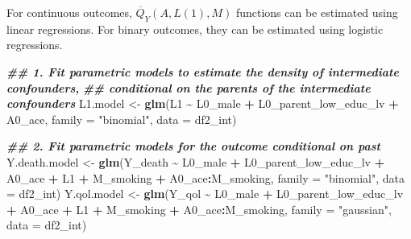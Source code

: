 \documentclass[
]{book}
\newenvironment{Shaded}{\begin{snugshade}}{\end{snugshade}}
\newcommand{\AttributeTok}[1]{\textcolor[rgb]{0.13,0.29,0.53}{#1}}
\newcommand{\DocumentationTok}[1]{\textcolor[rgb]{0.56,0.35,0.01}{\textbf{\textit{#1}}}}
\newcommand{\FunctionTok}[1]{\textcolor[rgb]{0.13,0.29,0.53}{\textbf{#1}}}
\newcommand{\NormalTok}[1]{#1}
\newcommand{\OtherTok}[1]{\textcolor[rgb]{0.56,0.35,0.01}{#1}}
\newcommand{\SpecialCharTok}[1]{\textcolor[rgb]{0.81,0.36,0.00}{\textbf{#1}}}
\newcommand{\StringTok}[1]{\textcolor[rgb]{0.31,0.60,0.02}{#1}}
\begin{document}
For continuous outcomes, \(\overline{Q}_Y(A,L(1),M)\) functions can be estimated using linear regressions. For binary outcomes, they can be estimated using logistic regressions.

\begin{Shaded}
\begin{Highlighting}[]
\DocumentationTok{\#\# 1. Fit parametric models to estimate the density of intermediate confounders, }
\DocumentationTok{\#\#    conditional on the parents of the intermediate confounders}
\NormalTok{L1.model }\OtherTok{\textless{}{-}} \FunctionTok{glm}\NormalTok{(L1 }\SpecialCharTok{\textasciitilde{}}\NormalTok{ L0\_male }\SpecialCharTok{+}\NormalTok{ L0\_parent\_low\_educ\_lv }\SpecialCharTok{+}\NormalTok{ A0\_ace, }
                \AttributeTok{family =} \StringTok{"binomial"}\NormalTok{, }\AttributeTok{data =}\NormalTok{ df2\_int)}

\DocumentationTok{\#\# 2. Fit parametric models for the outcome conditional on past}
\NormalTok{Y.death.model }\OtherTok{\textless{}{-}} \FunctionTok{glm}\NormalTok{(Y\_death }\SpecialCharTok{\textasciitilde{}}\NormalTok{ L0\_male }\SpecialCharTok{+}\NormalTok{ L0\_parent\_low\_educ\_lv }\SpecialCharTok{+}\NormalTok{ A0\_ace }\SpecialCharTok{+}\NormalTok{ L1 }\SpecialCharTok{+} 
\NormalTok{                                  M\_smoking }\SpecialCharTok{+}\NormalTok{ A0\_ace}\SpecialCharTok{:}\NormalTok{M\_smoking, }
                      \AttributeTok{family =} \StringTok{"binomial"}\NormalTok{, }\AttributeTok{data =}\NormalTok{ df2\_int)}
\NormalTok{Y.qol.model }\OtherTok{\textless{}{-}} \FunctionTok{glm}\NormalTok{(Y\_qol }\SpecialCharTok{\textasciitilde{}}\NormalTok{ L0\_male }\SpecialCharTok{+}\NormalTok{ L0\_parent\_low\_educ\_lv }\SpecialCharTok{+}\NormalTok{ A0\_ace }\SpecialCharTok{+}\NormalTok{ L1 }\SpecialCharTok{+} 
\NormalTok{                              M\_smoking }\SpecialCharTok{+}\NormalTok{ A0\_ace}\SpecialCharTok{:}\NormalTok{M\_smoking, }
                    \AttributeTok{family =} \StringTok{"gaussian"}\NormalTok{, }\AttributeTok{data =}\NormalTok{ df2\_int)}


\end{Highlighting}
\end{Shaded}
\end{document}
